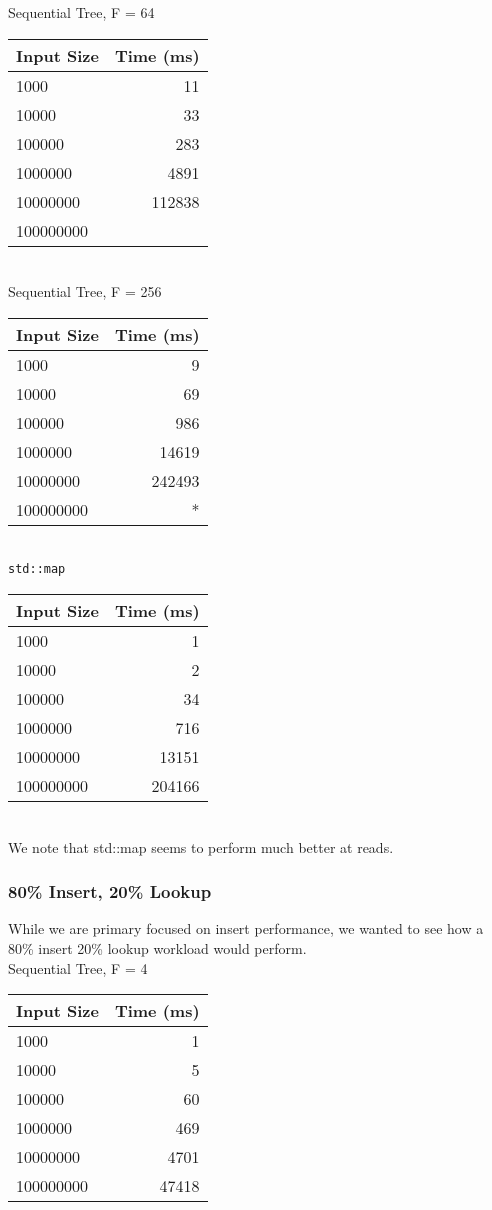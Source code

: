 \documentclass{sig-alternate}
\begin{document}
Sequential Tree, F = 64\\
\begin{tabular}{| l | r |}
  \hline
  Input Size & Time (ms)\\  \hline
  1000			&	11	\\
  10000			&	33	\\
  100000		&	283	\\
  1000000		&	4891	\\
  10000000		&	112838	\\
  100000000		&	\\
  \hline
\end{tabular} \\

Sequential Tree, F = 256\\
\begin{tabular}{| l | r |}
  \hline
  Input Size & Time (ms)\\  \hline
  1000			&	9	\\
  10000			&	69	\\
  100000		&	986	\\
  1000000		&	14619	\\
  10000000		&	242493	\\
  100000000		&	*	\\
  \hline
\end{tabular}\\

\texttt{std::map}\\
\begin{tabular}{| l | r |}
  \hline
  Input Size & Time (ms)\\  \hline
  1000			&	1	\\
  10000			&	2	\\
  100000		&	34	\\
  1000000		&	716	\\
  10000000		&	13151	\\
  100000000		&	204166	\\
  \hline
\end{tabular}\\
We note that std::map seems to perform much better at reads.

\subsubsection{80\% Insert, 20\% Lookup}
While we are primary focused on insert performance, we wanted to see how a 80\% insert 20\% lookup workload would perform.\\
Sequential Tree, F = 4\\
\begin{tabular}{| l | r |}
  \hline
  Input Size & Time (ms)\\  \hline
  1000			&	1	\\
  10000			&	5	\\
  100000		&	60	\\
  1000000		&	469	\\
  10000000		&	4701	\\
  100000000		&	47418	\\
  \hline
\end{tabular} \\
\end{document}
